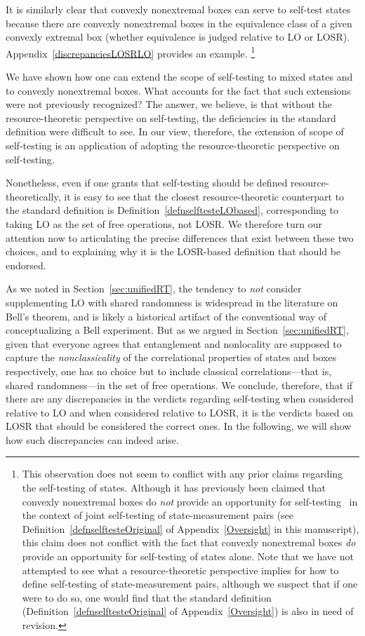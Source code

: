 \documentclass[prx,11pt,letterpaper,twocolumn,accepted=2023-11-27]{quantumarticle}
\theoremstyle{plain}
\theoremstyle{definition}
\begin{document}
It is similarly clear that 
convexly nonextremal boxes can serve to self-test states because there are convexly nonextremal boxes in the equivalence class of a given convexly extremal box (whether equivalence is judged relative to LO or LOSR).  Appendix~\ref{discrepanciesLOSRLO} provides an example. \footnote{This observation does not seem to conflict with any prior claims regarding the self-testing of states.  Although it has previously been claimed that convexly nonextremal boxes do {\em not} provide an opportunity for self-testing~\cite[Appendix C]{geometry2018} in the context of joint self-testing of state-measurement pairs (see Definition~\ref{defnselftesteOriginal} of Appendix~\ref{Oversight} in this manuscript), this claim does not conflict with the fact that convexly nonextremal boxes {\em do} provide an opportunity for self-testing of states alone.  Note that we have not attempted to see what a resource-theoretic perspective implies for how to define self-testing of state-measurement pairs, although we suspect that if one were to do so, one would find that the standard definition (Definition~\ref{defnselftesteOriginal} of Appendix~\ref{Oversight}) is also in need of revision.}

We have shown how one can extend the scope of self-testing to mixed states and to convexly nonextremal boxes. 
What accounts for the fact that such extensions  were not previously recognized?  The answer, we believe, is that without the resource-theoretic perspective on self-testing, the deficiencies in the standard definition were difficult to see.  In our view, therefore, the extension of scope of self-testing is an application of adopting the resource-theoretic perspective on self-testing. 


Nonetheless, even if one grants that self-testing should be defined resource-theoretically, it is easy to see that 
 the closest resource-theoretic counterpart to the standard definition is Definition~\ref{defnselftesteLObased}, corresponding to taking LO as the set of free operations, not LOSR.  We therefore turn our attention now to articulating the precise differences that exist between these two choices, and to explaining why it is the LOSR-based definition that should be endorsed. 


  As we noted in Section~\ref{sec:unifiedRT}, the tendency to {\em not} consider supplementing LO with shared randomness is widespread in the literature on Bell's theorem, and is likely 
a historical artifact of the conventional way of conceptualizing a Bell experiment.  
But as we argued in Section~\ref{sec:unifiedRT}, given that everyone agrees that entanglement and nonlocality are supposed to capture the {\em nonclassicality} of the correlational properties of states and boxes respectively, one has no choice but to include classical correlations---that is, shared randomness---in the set of free operations.   We conclude, therefore, that if there are any discrepancies in the verdicts regarding self-testing when considered relative to LO and when considered relative to LOSR, it is the verdicts based on LOSR that should be considered the correct ones.  In the following, we will show how such discrepancies can indeed arise.
\end{document}
